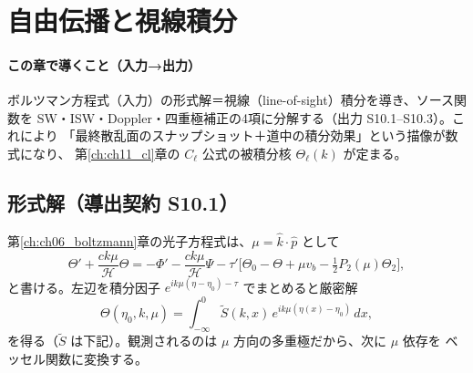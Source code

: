 \section{自由伝播と視線積分}
\label{ch:ch10_los}

\paragraph{この章で導くこと（入力→出力）}
ボルツマン方程式（入力）の形式解＝視線（line-of-sight）積分を導き、ソース関数を
SW・ISW・Doppler・四重極補正の4項に分解する（出力 S10.1--S10.3）。これにより
「最終散乱面のスナップショット＋道中の積分効果」という描像が数式になり、
第\ref{ch:ch11_cl}章の $C_\ell$ 公式の被積分核 $\Theta_\ell(k)$ が定まる。

\subsection{形式解（導出契約 S10.1）}
第\ref{ch:ch06_boltzmann}章の光子方程式は、$\mu=\hat k\cdot\hat p$ として
\begin{equation}
  \Theta'+\frac{ck\mu}{\mathcal H}\Theta
  =-\Phi'-\frac{ck\mu}{\mathcal H}\Psi-\tau'\big[\Theta_0-\Theta+\mu v_b-\tfrac12 P_2(\mu)\Theta_2\big],
\end{equation}
と書ける。左辺を積分因子 $e^{ik\mu(\eta-\eta_0)-\tau}$ でまとめると厳密解
\begin{equation}
  \Theta(\eta_0,k,\mu)=\int_{-\infty}^{0}\tilde S(k,x)\,e^{ik\mu(\eta(x)-\eta_0)}\,dx,
\end{equation}
を得る（$\tilde S$ は下記）。観測されるのは $\mu$ 方向の多重極だから、次に $\mu$ 依存を
ベッセル関数に変換する。

